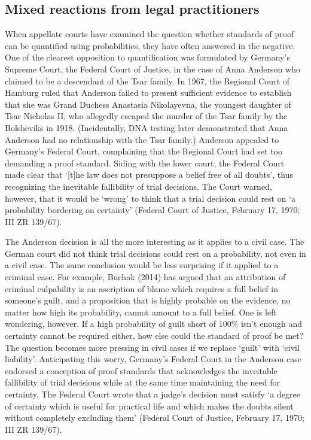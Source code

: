 \documentclass[10pt,dvipsnames,enabledeprecatedfontcommands]{scrartcl}
\begin{document}
\subsection{Mixed reactions from legal
practitioners}\label{mixed-reactions-from-legal-practitioners}

When appellate courts have examined the question whether standards of
proof can be quantified using probabilities, they have often answered in
the negative. One of the clearest opposition to quantification was
formulated by Germany's Supreme Court, the Federal Court of Justice, in
the case of Anna Anderson who claimed to be a descendant of the Tsar
family. In 1967, the Regional Court of Hamburg ruled that Anderson
failed to present sufficient evidence to establish that she was Grand
Duchess Anastasia Nikolayevna, the youngest daughter of Tsar Nicholas
II, who allegedly escaped the murder of the Tsar family by the
Bolsheviks in 1918. (Incidentally, DNA testing later demonstrated that
Anna Anderson had no relationship with the Tsar family.) Anderson
appealed to Germany's Federal Court, complaining that the Regional Court
had set too demanding a proof standard. Siding with the lower court, the
Federal Court made clear that `{[}t{]}he law does not presuppose a
belief free of all doubts', thus recognizing the inevitable fallibility
of trial decisions. The Court warned, however, that it would be `wrong'
to think that a trial decision could rest on `a probability bordering on
certainty' (Federal Court of Justice, February 17, 1970; III ZR 139/67).

The Anderson decision is all the more interesting as it applies to a
civil case. The German court did not think trial decisions could rest on
a probability, not even in a civil case. The same conclusion would be
less surprising if it applied to a criminal case. For example, Buchak
(2014) has argued that an attribution of criminal culpability is an
ascription of blame which requires a full belief in someone's guilt, and
a proposition that is highly probable on the evidence, no matter how
high its probability, cannot amount to a full belief. One is left
wondering, however. If a high probability of guilt short of 100\% isn't
enough and certainty cannot be required either, how else could the
standard of proof be met? The question becomes more pressing in civil
cases if we replace `guilt' with `civil liability'. Anticipating this
worry, Germany's Federal Court in the Anderson case endorsed a
conception of proof standards that acknowledges the inveitable
fallibility of trial decisions while at the same time maintaining the
need for certainty. The Federal Court wrote that a judge's decision must
satisfy `a degree of certainty which is useful for practical life and
which makes the doubts silent without completely excluding them'
(Federal Court of Justice, February 17, 1970; III ZR 139/67).
\end{document}
